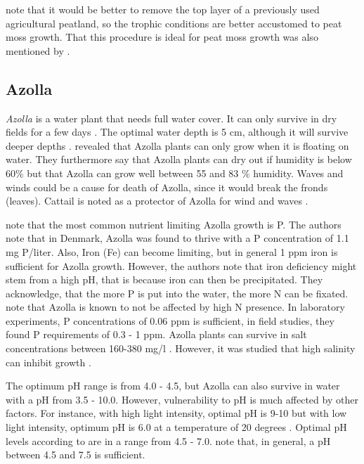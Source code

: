 \documentclass[a4paper,12pt]{scrbook}
\begin{document}
\citet{fritz2014paludicultuur} note that it would be better to remove the top layer of a previously used agricultural peatland, so the trophic conditions are better accustomed to peat moss growth. That this procedure is ideal for peat moss growth was also mentioned by \citet{Temmink2017196}.

\subsection{Azolla}

\textit{Azolla} is a water plant that needs full water cover. It can only survive in dry fields for a few days \citep{wagner1997azolla}. The optimal water depth is 5 cm, although it will survive deeper depths \citep{wagner1997azolla}. \citet{sabetraftar2013review} revealed that Azolla plants can only grow when it is floating on water. They furthermore say that Azolla plants can dry out if humidity is below 60\% but that Azolla can grow well between 55 and 83 \% humidity.  Waves and winds could be a cause for death of Azolla, since it would break the fronds (leaves). Cattail is noted as a protector of Azolla for wind and waves \citep{sabetraftar2013review}.  

\citet{lumpkin1980azolla} note that the most common nutrient limiting Azolla growth is P. The authors note that in Denmark, Azolla was found to thrive with a P concentration of 1.1 mg P/liter. Also, Iron (Fe) can become limiting, but in general 1 ppm iron is  sufficient for Azolla growth. However, the authors note that iron deficiency might stem from a high pH, that is because iron can then be precipitated. They acknowledge, that the more P is put into the water, the more N can be fixated. \citet{sabetraftar2013review} note that Azolla is known to not be affected by high N presence. In laboratory experiments, P concentrations of 0.06 ppm is sufficient, in field studies, they found P requirements of 0.3 - 1 ppm. Azolla plants can survive in salt concentrations between 160-380 mg/l  \citep{lumpkin1980azolla}. However, it was studied that high salinity can inhibit growth \citep{sabetraftar2013review, lumpkin1980azolla}. 

The optimum pH range is from 4.0 - 4.5, but Azolla can also survive in water with a pH from 3.5 - 10.0. However, vulnerability to pH is much affected by other factors. For instance, with high light intensity, optimal pH is 9-10 but with low light intensity, optimum pH is 6.0 at a temperature of 20 degrees \citep{wagner1997azolla}. Optimal pH levels according to \citet{lumpkin1980azolla} are in a range from 4.5 - 7.0. \citet{sabetraftar2013review} note that, in general, a pH between 4.5 and 7.5 is sufficient.
\end{document}
